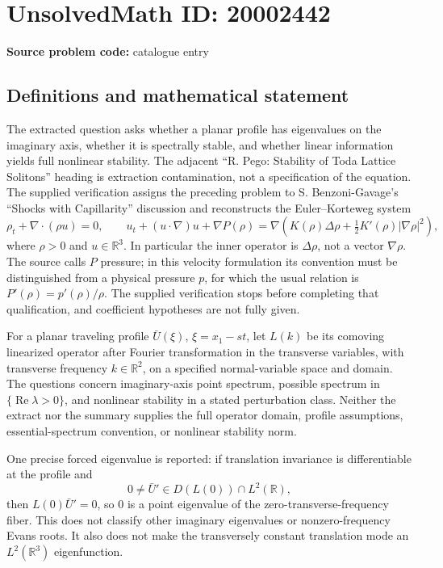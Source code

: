 \documentclass[11pt]{article}
\newcommand{\R}{\mathbb{R}}
\begin{document}
\section*{UnsolvedMath ID: 20002442}
\textbf{Source problem code:} catalogue entry
\subsection{Definitions and mathematical statement}
The extracted question asks whether a planar profile has eigenvalues on the imaginary axis, whether it is spectrally stable, and whether linear information yields full nonlinear stability. The adjacent ``R. Pego: Stability of Toda Lattice Solitons'' heading is extraction contamination, not a specification of the equation. The supplied verification assigns the preceding problem to S. Benzoni-Gavage's ``Shocks with Capillarity'' discussion and reconstructs the Euler--Korteweg system
\[
 \rho_t+\nabla\cdot(\rho u)=0,\qquad
 u_t+(u\cdot\nabla)u+\nabla P(\rho)
 =\nabla\left(K(\rho)\Delta\rho+\tfrac12K'(\rho)|\nabla\rho|^2\right),
\]
where $\rho>0$ and $u\in\R^3$. In particular the inner operator is $\Delta\rho$, not a vector $\nabla\rho$. The source calls $P$ pressure; in this velocity formulation its convention must be distinguished from a physical pressure $p$, for which the usual relation is $P'(\rho)=p'(\rho)/\rho$. The supplied verification stops before completing that qualification, and coefficient hypotheses are not fully given.

For a planar traveling profile $\bar U(\xi)$, $\xi=x_1-st$, let $L(k)$ be its comoving linearized operator after Fourier transformation in the transverse variables, with transverse frequency $k\in\R^2$, on a specified normal-variable space and domain. The questions concern imaginary-axis point spectrum, possible spectrum in $\{\operatorname{Re}\lambda>0\}$, and nonlinear stability in a stated perturbation class. Neither the extract nor the summary supplies the full operator domain, profile assumptions, essential-spectrum convention, or nonlinear stability norm.

One precise forced eigenvalue is reported: if translation invariance is differentiable at the profile and
\[
 0\ne\bar U'\in D(L(0))\cap L^2(\R),
\]
then $L(0)\bar U'=0$, so $0$ is a point eigenvalue of the zero-transverse-frequency fiber. This does not classify other imaginary eigenvalues or nonzero-frequency Evans roots. It also does not make the transversely constant translation mode an $L^2(\R^3)$ eigenfunction.
\end{document}
